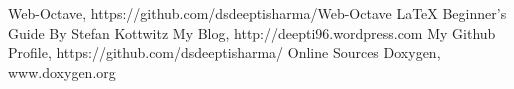 
\begin{thebibliography}{9}
\bibitem{} Web-Octave, https://github.com/dsdeeptisharma/Web-Octave
\bibitem{} \LaTeX{} Beginner's Guide By Stefan Kottwitz 
\bibitem{} My Blog, http://deepti96.wordpress.com
\bibitem{} My Github Profile, https://github.com/dsdeeptisharma/
\bibitem{} Online Sources
\bibitem{} Doxygen, www.doxygen.org
\end{thebibliography}


